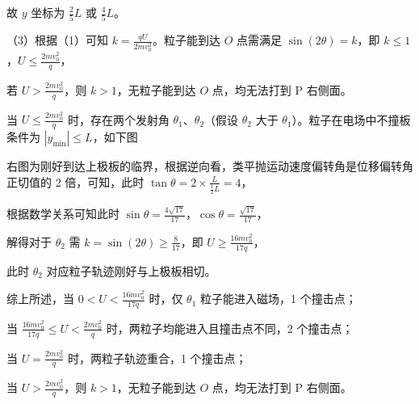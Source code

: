 \documentclass[\gkver]{gaokaozhenti}
\begin{document}
\begin{enumerate}
{故 $y$ 坐标为 $\frac{2}{5}L$ 或 $\frac{4}{5}L$。

（3）根据（1）可知 $k=\frac{qU}{2mv_{0}^{2}}$。粒子能到达 $O$ 点需满足 $\sin(2\theta)=k$，即 $k\leq1$，$U\leq\frac{2mv_{0}^{2}}{q}$，

若 $U>\frac{2mv_{0}^{2}}{q}$，则 $k>1$，无粒子能到达 $O$ 点，均无法打到 P 右侧面。

当 $U\leq\frac{2mv_{0}^{2}}{q}$ 时，存在两个发射角 $\theta_{1}$、$\theta_{2}$（假设 $\theta_{2}$ 大于 $\theta_{1}$）。粒子在电场中不撞板条件为 $|y_{\min}|\leq L$，如下图


右图为刚好到达上极板的临界，根据逆向看，类平抛运动速度偏转角是位移偏转角正切值的 2 倍，可知，此时 $\tan\theta=2\times\frac{L}{\frac{1}{2}L}=4$，

根据数学关系可知此时 $\sin\theta=\frac{4\sqrt{17}}{17}$，$\cos\theta=\frac{\sqrt{17}}{17}$，

解得对于 $\theta_{2}$ 需 $k=\sin(2\theta)\geq\frac{8}{17}$，即 $U\geq\frac{16mv_{0}^{2}}{17q}$，

此时 $\theta_{2}$ 对应粒子轨迹刚好与上极板相切。

综上所述，当 $0<U<\frac{16mv_{0}^{2}}{17q}$ 时，仅 $\theta_{1}$ 粒子能进入磁场，1 个撞击点；

当 $\frac{16mv_{0}^{2}}{17q}\leq U<\frac{2mv_{0}^{2}}{q}$ 时，两粒子均能进入且撞击点不同，2 个撞击点；

当 $U=\frac{2mv_{0}^{2}}{q}$ 时，两粒子轨迹重合，1 个撞击点；

当 $U>\frac{2mv_{0}^{2}}{q}$，则 $k>1$，无粒子能到达 $O$ 点，均无法打到 P 右侧面。
}

\end{enumerate}
\end{document}
